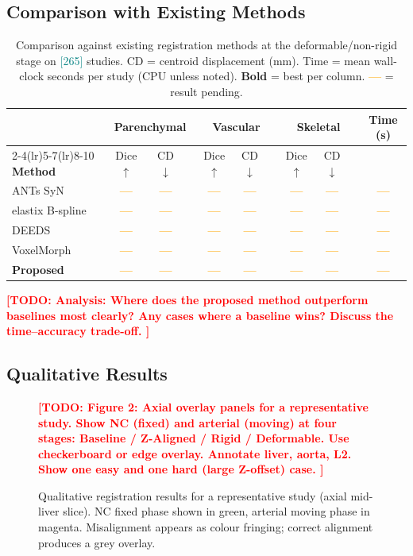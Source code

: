 \documentclass[10pt,twocolumn]{article}
\newcommand{\TODO}[1]{\textcolor{red}{\textbf{[TODO: #1]}}}
\newcommand{\NUM}[1]{\textcolor{teal}{[#1]}}
\newcommand{\BLANK}{\textcolor{orange}{\textbf{---}}}   %
\begin{document}
\subsection{Comparison with Existing Methods}
\label{sec:comparison}

\begin{table}[t]
\centering
\caption{%
  Comparison against existing registration methods at the
  deformable/non-rigid stage on \NUM{265} studies.
  CD = centroid displacement (mm). Time = mean wall-clock
  seconds per study (CPU unless noted). \textbf{Bold} = best per column.
  \BLANK{} = result pending.
}
\label{tab:comparison}
\begin{tabular}{l ccc ccc ccc c}
\toprule
& \multicolumn{3}{c}{\textbf{Parenchymal}} &
  \multicolumn{3}{c}{\textbf{Vascular}} &
  \multicolumn{3}{c}{\textbf{Skeletal}} &
  \textbf{Time (s)} \\
\cmidrule(lr){2-4}\cmidrule(lr){5-7}\cmidrule(lr){8-10}
\textbf{Method} &
  Dice $\uparrow$ & CD $\downarrow$ && Dice $\uparrow$ & CD $\downarrow$ &&
  Dice $\uparrow$ & CD $\downarrow$ && \\
\midrule
ANTs SyN~\cite{avants2008}
  & \BLANK & \BLANK && \BLANK & \BLANK && \BLANK & \BLANK && \BLANK \\
elastix B-spline~\cite{klein2010}
  & \BLANK & \BLANK && \BLANK & \BLANK && \BLANK & \BLANK && \BLANK \\
DEEDS~\cite{heinrich2013}
  & \BLANK & \BLANK && \BLANK & \BLANK && \BLANK & \BLANK && \BLANK \\
VoxelMorph~\cite{balakrishnan2019}
  & \BLANK & \BLANK && \BLANK & \BLANK && \BLANK & \BLANK && \BLANK \\
\midrule
\textbf{Proposed}
  & \textbf{\BLANK} & \textbf{\BLANK} && \textbf{\BLANK} & \textbf{\BLANK} &&
    \textbf{\BLANK} & \textbf{\BLANK} && \BLANK \\
\bottomrule
\end{tabular}
\end{table}

\TODO{%
  Analysis: Where does the proposed method outperform baselines most
  clearly? Any cases where a baseline wins? Discuss the time--accuracy
  trade-off.
}

\subsection{Qualitative Results}
\label{sec:qual}

\begin{figure}[t]
  \centering
  \TODO{%
    Figure 2: Axial overlay panels for a representative study.
    Show NC (fixed) and arterial (moving) at four stages:
    Baseline / Z-Aligned / Rigid / Deformable.
    Use checkerboard or edge overlay. Annotate liver, aorta, L2.
    Show one easy and one hard (large Z-offset) case.
  }
  \caption{Qualitative registration results for a representative study
  (axial mid-liver slice). NC fixed phase shown in green, arterial
  moving phase in magenta. Misalignment appears as colour fringing;
  correct alignment produces a grey overlay.}
  \label{fig:qual}
\end{figure}
\end{document}
